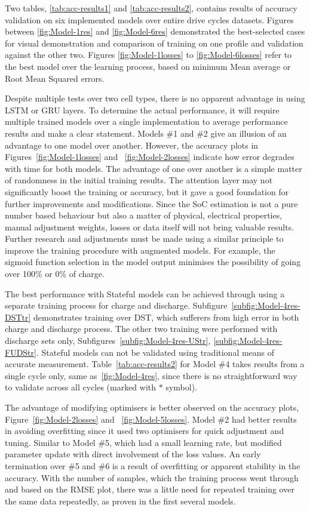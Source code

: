 Two tables, \ref{tab:acc-results1} and \ref{tab:acc-results2}, contains results of accuracy validation on six implemented models over entire drive cycles datasets.
Figures between \ref{fig:Model-1res} and \ref{fig:Model-6res} demonstrated the best-selected cases for visual demonstration and comparison of training on one profile and validation against the other two.
Figures \ref{fig:Model-1losses} to \ref{fig:Model-6losses} refer to the best model over the learning process, based on minimum Mean average or Root Mean Squared errors.

%
%
Despite multiple tests over two cell types, there is no apparent advantage in using LSTM or GRU layers.
To determine the actual performance, it will require multiple trained models over a single implementation to average performance results and make a clear statement.
Models \#1 and \#2 give an illusion of an advantage to one model over another.
However, the accuracy plots in Figures~\ref{fig:Model-1losses} and ~\ref{fig:Model-2losses} indicate how error degrades with time for both models.
The advantage of one over another is a simple matter of randomness in the initial training results.
The attention layer may not significantly boost the training or accuracy, but it gave a good foundation for further improvements and modifications.
Since the SoC estimation is not a pure number based behaviour but also a matter of physical, electrical properties, manual adjustment weights, losses or data itself will not bring valuable results.
Further research and adjustments must be made using a similar principle to improve the training procedure with augmented models. 
For example, the sigmoid function selection in the model output minimises the possibility of going over 100\% or 0\% of charge.

%
%
The best performance with Stateful models can be achieved through using a separate training process for charge and discharge. 
Subfigure~\ref{subfig:Model-4res-DSTtr} demonstrates training over DST, which sufferers from high error in both charge and discharge process.
The other two training were performed with discharge sets only, Subfigures~\ref{subfig:Model-4res-UStr}, \ref{subfig:Model-4res-FUDStr}.
Stateful models can not be validated using traditional means of accurate measurement.
Table~\ref{tab:acc-results2} for Model \#4 takes results from a single cycle only, same as~\ref{fig:Model-4res}, since there is no straightforward way to validate across all cycles (marked with $*$ symbol).

%
%
The advantage of modifying optimisers is better observed on the accuracy plots, Figure~\ref{fig:Model-2losses} and ~\ref{fig:Model-5losses}.
Model \#2 had better results in avoiding overfitting since it used two optimisers for quick adjustment and tuning.
Similar to Model \#5, which had a small learning rate, but modified parameter update with direct involvement of the loss values.
An early termination over \#5 and \#6 is a result of overfitting or apparent stability in the accuracy.
With the number of samples, which the training process went through and based on the RMSE plot, there was a little need for repeated training over the same data repeatedly, as proven in the first several models.

